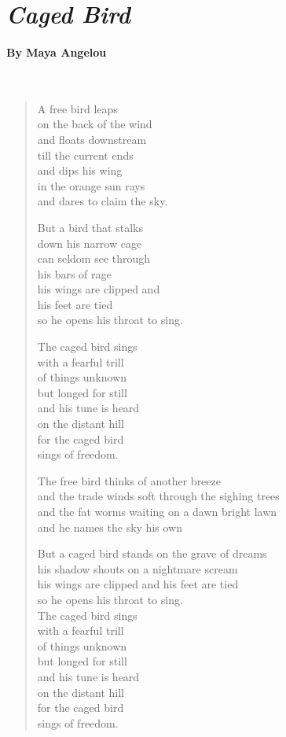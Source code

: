 \documentclass[12pt, openany, letterpaper]{memoir}
\begin{document}
\newpage
{}
\section*{\emph{Caged Bird}}
\paragraph{By Maya Angelou}~
\begin{verse}
	A free bird leaps\\
	on the back of the wind\\
	and floats downstream\\ 
	till the current ends\\
	and dips his wing\\
	in the orange sun rays\\
	and dares to claim the sky.
	
	But a bird that stalks\\
	down his narrow cage\\
	can seldom see through\\
	his bars of rage\\
	his wings are clipped and\\
	his feet are tied\\
	so he opens his throat to sing.
	
	The caged bird sings\\
	with a fearful trill\\ 
	of things unknown\\
	but longed for still\\
	and his tune is heard\\
	on the distant hill\\
	for the caged bird\\
	sings of freedom.
	
	The free bird thinks of another breeze\\
	and the trade winds soft through the sighing trees\\
	and the fat worms waiting on a dawn bright lawn\\
	and he names the sky his own
	
	But a caged bird stands on the grave of dreams\\
	his shadow shouts on a nightmare scream\\
	his wings are clipped and his feet are tied\\
	so he opens his throat to sing.\\
	
	The caged bird sings\\
	with a fearful trill\\ 
	of things unknown\\
	but longed for still\\
	and his tune is heard\\
	on the distant hill\\
	for the caged bird\\
	sings of freedom.\\	
\end{verse}
\end{document}
